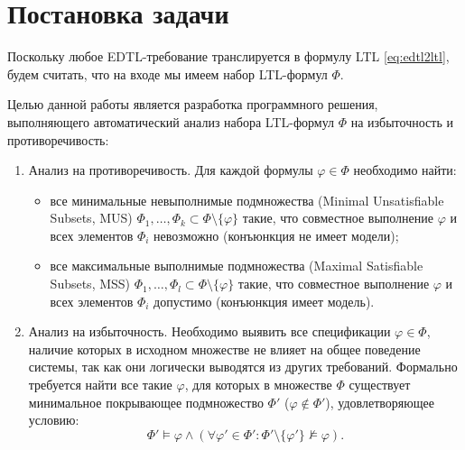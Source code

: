 \clearpage
\pagebreak

\section{Постановка задачи}\label{sec:problem}
Поскольку любое EDTL-требование транслируется в формулу LTL \eqref{eq:edtl2ltl}, будем считать, что на входе мы имеем набор LTL-формул $\Phi$.

Целью данной работы является разработка программного решения, выполняющего автоматический анализ набора LTL-формул $\Phi$ на избыточность и противоречивость:
\begin{enumerate}
    \item Анализ на противоречивость. Для каждой формулы $\varphi \in \Phi$ необходимо найти:
    \begin{itemize}
        \item все минимальные невыполнимые подмножества (Minimal Unsatisfiable Subsets, MUS) $\Phi_1, \dots, \Phi_k \subset \Phi \setminus \{\varphi\}$ такие, что совместное выполнение $\varphi$ и всех элементов $\Phi_i$ невозможно (конъюнкция не имеет модели);
        \item все максимальные выполнимые подмножества (Maximal Satisfiable Subsets, MSS) $\Phi_1, \dots, \Phi_l \subset \Phi \setminus \{\varphi\}$ такие, что совместное выполнение $\varphi$ и всех элементов $\Phi_i$ допустимо (конъюнкция имеет модель).
    \end{itemize}

    \item Анализ на избыточность. Необходимо выявить все спецификации $\varphi \in \Phi$, наличие которых в исходном множестве не влияет на общее поведение системы, так как они логически выводятся из других требований. Формально требуется найти все такие $\varphi$, для которых в множестве $\Phi$ существует минимальное покрывающее подмножество $\Phi'$ ($\varphi \notin \Phi'$), удовлетворяющее условию:
    $$ \Phi' \models \varphi \land (\forall \varphi' \in \Phi' \colon \Phi' \setminus \{\varphi'\} \not\models \varphi). $$
\end{enumerate}

